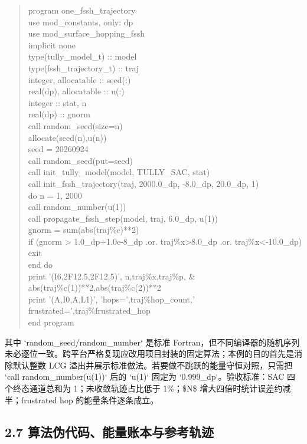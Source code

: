 \documentclass[UTF8,openany,11pt,fontset=fandol]{ctexbook}
\begin{document}
\begin{quote}
program one\_fssh\_trajectory\\
use mod\_constants, only: dp\\
use mod\_surface\_hopping\_fssh\\
implicit none\\
type(tully\_model\_t) :: model\\
type(fssh\_trajectory\_t) :: traj\\
integer, allocatable :: seed(:)\\
real(dp), allocatable :: u(:)\\
integer :: stat, n\\
real(dp) :: gnorm\\
call random\_seed(size=n)\\
allocate(seed(n),u(n))\\
seed = 20260924\\
call random\_seed(put=seed)\\
call init\_tully\_model(model, TULLY\_SAC, stat)\\
call init\_fssh\_trajectory(traj, 2000.0\_dp, -8.0\_dp, 20.0\_dp, 1)\\
do n = 1, 2000\\
call random\_number(u(1))\\
call propagate\_fssh\_step(model, traj, 6.0\_dp, u(1))\\
gnorm = sum(abs(traj\%c)**2)\\
if (gnorm \textgreater{} 1.0\_dp+1.0e-8\_dp .or.
traj\%x\textgreater8.0\_dp .or. traj\%x\textless-10.0\_dp) exit\\
end do\\
print '(I6,2F12.5,2F12.5)', n,traj\%x,traj\%p, \&\\
abs(traj\%c(1))**2,abs(traj\%c(2))**2\\
print '(A,I0,A,L1)', 'hops=',traj\%hop\_count,'
frustrated=',traj\%frustrated\_hop\\
end program
\end{quote}

其中 `random\_seed/random\_number` 是标准
Fortran，但不同编译器的随机序列未必逐位一致。跨平台严格复现应改用项目封装的固定算法；本例的目的首先是消除默认整数
LCG 溢出并展示标准做法。若要做不跳跃的能量守恒对照，只需把 `call
random\_number(u(1))` 后的 `u(1)` 固定为 `0.999\_dp`。验收标准：SAC
四个终态通道总和为 1；未收敛轨迹占比低于 1\%；\$N\$
增大四倍时统计误差约减半；frustrated hop 的能量条件逐条成立。

\subsection{\texorpdfstring{\textbf{2.7
算法伪代码、能量账本与参考轨迹}}{2.7 算法伪代码、能量账本与参考轨迹}}\label{ux7b97ux6cd5ux4f2aux4ee3ux7801ux80fdux91cfux8d26ux672cux4e0eux53c2ux8003ux8f68ux8ff9}
\end{document}
